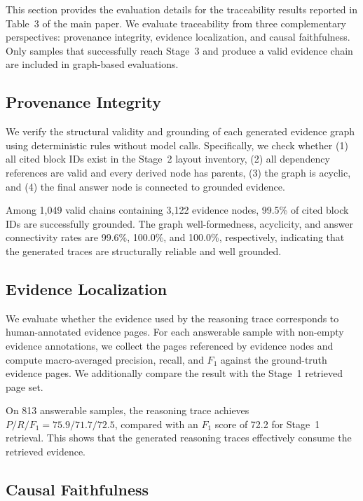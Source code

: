 \documentclass[letterpaper]{article} %
\begin{document}
This section provides the evaluation details for the traceability results reported in Table~3 of the main paper. We evaluate traceability from three complementary perspectives: provenance integrity, evidence localization, and causal faithfulness. Only samples that successfully reach Stage~3 and produce a valid evidence chain are included in graph-based evaluations.

\subsection{Provenance Integrity}

We verify the structural validity and grounding of each generated evidence graph using deterministic rules without model calls. Specifically, we check whether (1) all cited block IDs exist in the Stage~2 layout inventory, (2) all dependency references are valid and every derived node has parents, (3) the graph is acyclic, and (4) the final answer node is connected to grounded evidence.

Among 1,049 valid chains containing 3,122 evidence nodes, 99.5\% of cited block IDs are successfully grounded. The graph well-formedness, acyclicity, and answer connectivity rates are 99.6\%, 100.0\%, and 100.0\%, respectively, indicating that the generated traces are structurally reliable and well grounded.

\subsection{Evidence Localization}

We evaluate whether the evidence used by the reasoning trace corresponds to human-annotated evidence pages. For each answerable sample with non-empty evidence annotations, we collect the pages referenced by evidence nodes and compute macro-averaged precision, recall, and $F_1$ against the ground-truth evidence pages. We additionally compare the result with the Stage~1 retrieved page set.

On 813 answerable samples, the reasoning trace achieves $P/R/F_1=75.9/71.7/72.5$, compared with an $F_1$ score of 72.2 for Stage~1 retrieval. This shows that the generated reasoning traces effectively consume the retrieved evidence.

\subsection{Causal Faithfulness}
\end{document}
